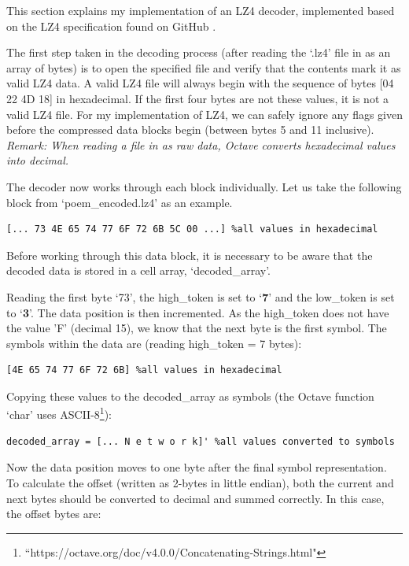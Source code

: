\documentclass[12pt]{article}
\begin{document}
This section explains my implementation of an LZ4 decoder, implemented based on the LZ4 specification found on GitHub \citep{lz4_github}.

The first step taken in the decoding process (after reading the `.lz4' file in as an array of bytes) is to open the specified file and verify that the contents mark it as valid LZ4 data. A valid LZ4 file will always begin with the sequence of bytes [04 22 4D 18] in hexadecimal. If the first four bytes are not these values, it is not a valid LZ4 file. For my implementation of LZ4, we can safely ignore any flags given before the compressed data blocks begin (between bytes 5 and 11 inclusive). \emph{Remark: When reading a file in as raw data, Octave converts hexadecimal values into decimal.}

The decoder now works through each block individually. Let us take the following block from `poem\_encoded.lz4' as an example.

\begin{verbatim}
[... 73 4E 65 74 77 6F 72 6B 5C 00 ...] %all values in hexadecimal
\end{verbatim}

Before working through this data block, it is necessary to be aware that the decoded data is stored in a cell array, `decoded\_array'.

Reading the first byte `73', the high\_token is set to `\textbf{7}' and the low\_token is set to `\textbf{3}'. The data position is then incremented. As the high\_token does not have the value 'F' (decimal 15), we know that the next byte is the first symbol. The symbols within the data are (reading high\_token = 7 bytes):

\begin{verbatim}
[4E 65 74 77 6F 72 6B] %all values in hexadecimal
\end{verbatim}

Copying these values to the decoded\_array as symbols (the Octave function `char' uses ASCII-8\footnote{``https://octave.org/doc/v4.0.0/Concatenating-Strings.html"}):

\begin{verbatim}
decoded_array = [... N e t w o r k]' %all values converted to symbols 
\end{verbatim}

Now the data position moves to one byte after the final symbol representation. To calculate the offset (written as 2-bytes in little endian), both the current and next bytes should be converted to decimal and summed correctly. In this case, the offset bytes are:
\end{document}
